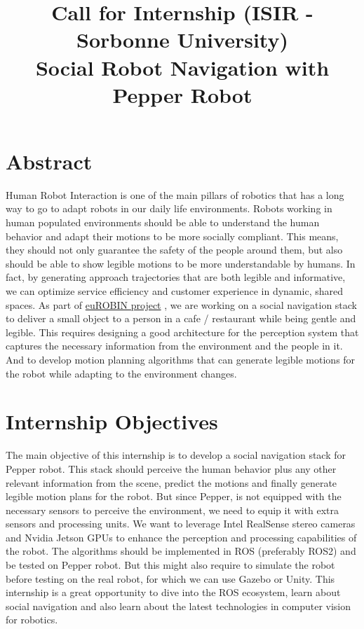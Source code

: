 \documentclass[11pt]{article}
\title{Call for Internship (ISIR - Sorbonne University)\\ Social Robot Navigation with Pepper Robot}
\begin{document}
\maketitle

\section{Abstract}
Human Robot Interaction is one of the main pillars of robotics that has a long way to go to adapt robots in our daily life environments.
Robots working in human populated environments should be able to understand the human behavior and adapt their motions to be more socially compliant.
This means, they should not only guarantee the safety of the people around them, but also should be able to show legible motions to be more understandable by humans.
In fact, by generating approach trajectories that are both legible and informative, we can optimize service efficiency and customer experience in dynamic, shared spaces.
As part of \href{https://www.eurobin-project.eu/} {euROBIN project}
, we are working on a social navigation stack to deliver a small object to a person in a cafe / restaurant while being gentle and legible.
This requires designing a good architecture for the perception system that captures the necessary information from the environment and the people in it.
And to develop motion planning algorithms that can generate legible motions for the robot while adapting to the environment changes.

\section{Internship Objectives}
The main objective of this internship is to develop a social navigation stack for Pepper robot.
This stack should perceive the human behavior plus any other relevant information from the scene, predict the motions and finally generate legible motion plans for the robot.
But since Pepper, is not equipped with the necessary sensors to perceive the environment, we need to equip it with extra sensors and processing units.
We want to leverage Intel RealSense stereo cameras and Nvidia Jetson GPUs to enhance the perception and processing capabilities of the robot.
The algorithms should be implemented in ROS (preferably ROS2) and be tested on Pepper robot.
But this might also require to simulate the robot before testing on the real robot, for which we can use Gazebo or Unity.
This internship is a great opportunity to dive into the ROS ecosystem, learn about social navigation and also learn about the latest technologies in computer vision for robotics.
\end{document}
